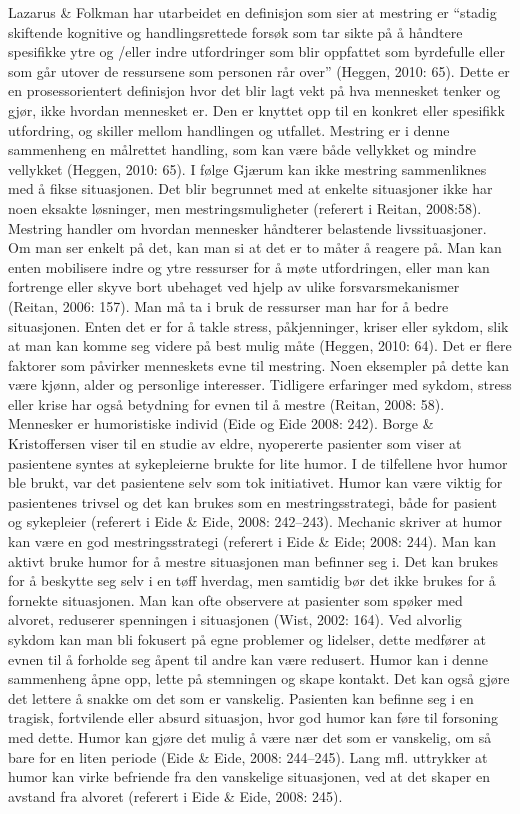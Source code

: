 Lazarus \&{} Folkman har utarbeidet en definisjon som sier at mestring er “stadig
skiftende kognitive og handlingsrettede forsøk som tar sikte på å håndtere
spesifikke ytre og /eller indre utfordringer som blir oppfattet som byrdefulle
eller som går utover de ressursene som personen rår over” (Heggen, 2010: 65).
Dette er en prosessorientert definisjon hvor det blir lagt vekt på hva
mennesket tenker og gjør, ikke hvordan mennesket er. Den er knyttet opp til en
konkret eller spesifikk utfordring, og skiller mellom handlingen og utfallet.
Mestring er i denne sammenheng en målrettet handling, som kan være både
vellykket og mindre vellykket (Heggen, 2010: 65). I følge Gjærum kan ikke
mestring sammenliknes med å fikse situasjonen. Det blir begrunnet med at
enkelte situasjoner ikke har noen eksakte løsninger, men mestringsmuligheter
(referert i Reitan, 2008:58).  Mestring handler om hvordan mennesker håndterer
belastende livssituasjoner. Om man ser enkelt på det, kan man si at det er to
måter å reagere på. Man kan enten mobilisere indre og ytre ressurser for å møte
utfordringen, eller man kan fortrenge eller skyve bort ubehaget ved hjelp av
ulike forsvarsmekanismer (Reitan, 2006: 157). Man må ta i bruk de ressurser man
har for å bedre situasjonen. Enten det er for å takle stress, påkjenninger,
kriser eller sykdom, slik at man kan komme seg videre på best mulig måte
(Heggen, 2010: 64).  Det er flere faktorer som påvirker menneskets evne til
mestring. Noen eksempler på dette kan være kjønn, alder og personlige
interesser. Tidligere erfaringer med sykdom, stress eller krise har også
betydning for evnen til å mestre (Reitan, 2008: 58).  Mennesker er humoristiske
individ (Eide og Eide 2008: 242). Borge \&{} Kristoffersen viser til en studie av
eldre, nyopererte pasienter som viser at pasientene syntes at sykepleierne
brukte for lite humor. I de tilfellene hvor humor ble brukt, var det pasientene
selv som tok initiativet.  Humor kan være viktig for pasientenes trivsel og det
kan brukes som en mestringsstrategi, både for pasient og sykepleier (referert i
Eide \&{} Eide, 2008: 242--243).  Mechanic skriver at humor kan være en god
mestringsstrategi (referert i Eide \&{} Eide; 2008: 244). Man kan aktivt bruke
humor for å mestre situasjonen man befinner seg i. Det kan brukes for å
beskytte seg selv i en tøff hverdag, men samtidig bør det ikke brukes for å
fornekte situasjonen. Man kan ofte observere at pasienter som spøker med
alvoret, reduserer spenningen i situasjonen (Wist, 2002: 164).  Ved alvorlig
sykdom kan man bli fokusert på egne problemer og lidelser, dette medfører at
evnen til å forholde seg åpent til andre kan være redusert. Humor kan i denne
sammenheng åpne opp, lette på stemningen og skape kontakt. Det kan også gjøre
det lettere å snakke om det som er vanskelig. Pasienten kan befinne seg i en
tragisk, fortvilende eller absurd situasjon, hvor god humor kan føre til
forsoning med dette. Humor kan gjøre det mulig å være nær det som er vanskelig,
om så bare for en liten periode (Eide \&{} Eide, 2008: 244--245). Lang mfl.
uttrykker at humor kan virke befriende fra den vanskelige situasjonen, ved at
det skaper en avstand fra alvoret (referert i Eide \&{} Eide, 2008: 245).

